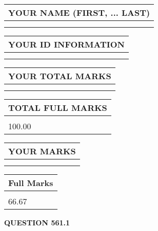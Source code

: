 \documentclass{ctexart}
\begin{document}
   
   
   
\newpage 
\setcounter{page}{ 
   561001 } 
   
   
   
   
\noindent\begin{tabular}{|l|}
\hline
YOUR NAME (FIRST, ... LAST)  \\
\hline
 \\ 
 \\ 
\hline
\end{tabular}
\hspace{0.05in} \begin{tabular}{|l|}
\hline
 YOUR   ID   INFORMATION  \\
\hline
 \\ 
 \\ 
\hline
\end{tabular}
   
   
\vspace{0.2in}\noindent\begin{tabular}{|l|}
\hline
YOUR TOTAL MARKS  \\
\hline
 \\ 
 \\ 
\hline
\end{tabular}
\hspace{0.05in} \begin{tabular}{|l|}
\hline
TOTAL FULL MARKS  \\
\hline
 \\ 
100.00 \\
\hline
\end{tabular}
   
   
 \vspace{0.2in}
 
 
 
 
   
   
  
\vspace{0.2in}
  
\noindent\begin{tabular}{|l|}
\hline
 YOUR MARKS  \\
\hline
 \\ 
 \\ 
\hline
\end{tabular}
\hspace{0.05in} \begin{tabular}{|l|}
\hline
 Full Marks  \\
\hline
 \\ 
66.67 \\
\hline
\end{tabular}
{\textbf{\Large{QUESTION
561.1 
}}}
  
\end{document}
